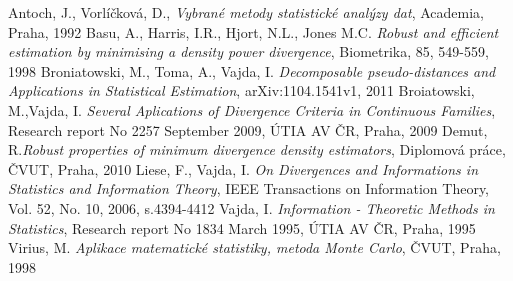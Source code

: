 \begin{thebibliography}{10}

%

Antoch, J., Vorlíčková, D., {\em Vybrané metody statistické analýzy dat}, Academia, Praha, 1992
Basu, A., Harris, I.R., Hjort, N.L., Jones M.C. {\em Robust and efficient estimation by minimising a density power divergence}, Biometrika, 85, 549-559, 1998
Broniatowski, M., Toma, A., Vajda, I. {\em Decomposable pseudo-distances and Applications in Statistical Estimation}, arXiv:1104.1541v1, 2011
Broiatowski, M.,Vajda, I. {\em Several Aplications of Divergence Criteria in Continuous Families}, Research report No 2257 September 2009, ÚTIA AV ČR, Praha, 2009
Demut, R.{\em Robust properties of minimum divergence density estimators}, Diplomová práce, ČVUT, Praha, 2010
Liese, F., Vajda, I. {\em On Divergences and Informations in Statistics and Information Theory}, IEEE Transactions on Information Theory, Vol. 52, No. 10, 2006, s.4394-4412
Vajda, I. {\em Information - Theoretic Methods in Statistics}, Research report No 1834 March 1995, ÚTIA AV ČR, Praha, 1995
Virius, M. {\em Aplikace matematické statistiky, metoda Monte Carlo}, ČVUT, Praha, 1998


\end{thebibliography}